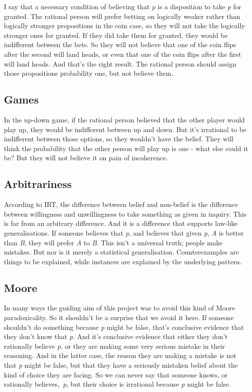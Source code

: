\documentclass[
  11pt,
]{book}
\begin{document}
I say that a necessary condition of believing that \emph{p} is a disposition to take \emph{p} for granted. The rational person will prefer betting on logically weaker rather than logically stronger propositions in the coin case, so they will not take the logically stronger ones for granted. If they did take them for granted, they would be indifferent between the bets. So they will not believe that one of the coin flips after the second will land heads, or even that one of the coin flips after the first will land heads. And that's the right result. The rational person should assign those propositions probability one, but not believe them.

\hypertarget{games}{%
\subsection{Games}\label{games}}

In the up-down game, if the rational person believed that the other player would play up, they would be indifferent between up and down. But it's irrational to be indifferent between those options, so they wouldn't have the belief. They will think the probability that the other person will play up is one - what else could it be? But they will not believe it on pain of incoherence.

\hypertarget{arbitrariness}{%
\subsection{Arbitrariness}\label{arbitrariness}}

According to IRT, the difference between belief and non-belief is the difference between willingness and unwillingness to take something as given in inquiry. This is far from an arbitrary difference. And it is a difference that supports law-like generalisations. If someone believes that \emph{p}, and believes that given \emph{p}, \emph{A} is better than \emph{B}, they will prefer \emph{A} to \emph{B}. This isn't a universal truth; people make mistakes. But nor is it merely a statistical generalisation. Counterexamples are things to be explained, while instances are explained by the underlying pattern.

\hypertarget{moore}{%
\subsection{Moore}\label{moore}}

In many ways the guiding aim of this project was to avoid this kind of Moore paradoxicality. So it shouldn't be a surprise that we avoid it here. If someone shouldn't do something because \emph{p} might be false, that's conclusive evidence that they don't know that \emph{p}. And it's conclusive evidence that either they don't rationally believe \emph{p}, or they are making some very serious mistake in their reasoning. And in the latter case, the reason they are making a mistake is not that \emph{p} might be false, but that they have a seriously mistaken belief about the kind of choice they are facing. So we can never say that someone knows, or rationally believes,~\emph{p}, but their choice is irrational because \emph{p} might be false.
\end{document}
